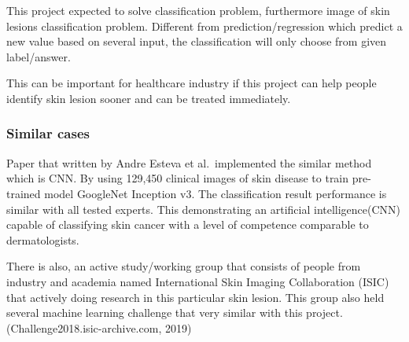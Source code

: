 \documentclass[11pt]{article}
\begin{document}
This project expected to solve classification problem, furthermore image
of skin lesions classification problem. Different from
prediction/regression which predict a new value based on several input,
the classification will only choose from given label/answer.

This can be important for healthcare industry if this project can help
people identify skin lesion sooner and can be treated immediately.

    \hypertarget{similar-cases}{%
\subsubsection{Similar cases}\label{similar-cases}}

Paper that written by Andre Esteva et al.~implemented the similar method
which is CNN. By using 129,450 clinical images of skin disease to train
pre-trained model GoogleNet Inception v3. The classification result
performance is similar with all tested experts. This demonstrating an
artificial intelligence(CNN) capable of classifying skin cancer with a
level of competence comparable to dermatologists.

There is also, an active study/working group that consists of people
from industry and academia named International Skin Imaging
Collaboration (ISIC) that actively doing research in this particular
skin lesion. This group also held several machine learning challenge
that very similar with this project. (Challenge2018.isic-archive.com,
2019)
\end{document}
